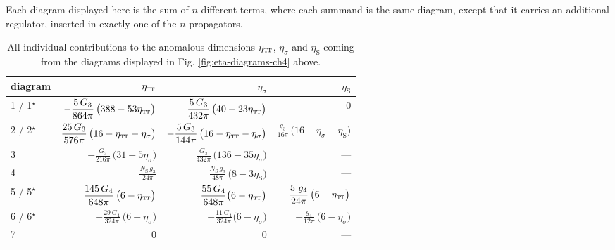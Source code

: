 \documentclass[11pt]{book} %
\newcommand\TTspace{ -1pt }
\newcommand\etaTT{ \eta_{\scriptscriptstyle{\mathrm{T\hspace{\TTspace}T}}} }
\newcommand\etaS{ \eta_{\scriptscriptstyle{\mathrm{S}}} }
\newcommand\NS{ N_{\scriptscriptstyle{\mathrm{S}}} }
\numberwithin{equation}{chapter}
\begin{document}
Each diagram displayed here is the sum of $n$ different terms, where each summand
is the same diagram, except that it carries an additional regulator,
inserted in exactly one of the $n$ propagators.

{
  \setlength{\extrarowheight}{10pt}
  \begin{table}[p]
    \begin{center}
      \begin{tabular}{ l@{\hskip 5mm} r@{\hskip 7mm} r@{\hskip 7mm} r }
        \toprule
        diagram        &  $\etaTT$ & $\eta_\sigma$ & $\etaS$ \\
        \midrule
        1 / 1$^\star$  &  $\displaystyle -\frac{5 \, G_3}{864 \pi} \, \big( 388-53\etaTT \big)$
                       &  $\displaystyle \frac{5 \,  G_3}{432\pi} \, \big(40-23\etaTT \big)$
                       &  $0$                                              \\
        2 / 2$^\star$  &  $\displaystyle \frac{25 \, G_3}{576 \pi} \, \big(16-\etaTT-\eta_{\sigma} \big)$
                       &  $\displaystyle - \frac{5 \,  G_3}{144\pi} \, \big(16-\etaTT- \eta_{\sigma} \big)$
                       &  $\displaystyle \frac{g_3}{16\pi} \, \big(16-\eta_{\sigma}-\etaS \big)$ \\
        3              &  $\displaystyle -\frac{G_3}{216 \pi} \, \big(31-5\eta_{\sigma} \big)$
                       &  $\displaystyle \frac{G_3}{432\pi} \, \big(136 - 35 \eta_{\sigma} \big)$
                       &  ---                                              \\
        4              &  $\displaystyle \frac{\NS \, g_3}{24 \pi}$
                       &  $\displaystyle \frac{\NS \, g_3}{48 \pi} \, \big(8-3\etaS \big)$
                       &  ---                                              \\
        5 / 5$^\star$  &  $\displaystyle \frac{145 \, G_4}{648 \pi} \, \big(6-\etaTT  \big)$
                       &  $\displaystyle \frac{55 \, G_4}{648 \pi}\big(6-\etaTT \big)$
                       &  $\displaystyle \frac{5 \ g_4}{24\pi} \, \big(6-\etaTT \big)$            \\
        6 / 6$^\star$  &  $\displaystyle -\frac{29 \, G_4}{324 \pi} \, \big(6-\eta_{\sigma} \big)$
                       &  $\displaystyle -\frac{11 \, G_4}{324 \pi} \big(6-\eta_{\sigma} \big)$
                       &  $\displaystyle -\frac{g_4}{12 \pi} \, \big(6-\eta_{\sigma} \big)$       \\
        7              &  $0$
                       &  $0$
                       &  ---                                              \\
        \bottomrule
      \end{tabular}
    \end{center}
    \caption[Coordinates and critical exponents of fixed points in perturbative approximation]
    {
      All individual contributions to the anomalous dimensions $\etaTT$, $\eta_\sigma$ and $\etaS$
      coming from the diagrams displayed in Fig. \ref{fig:eta-diagrams-ch4} above.
    }
    \label{tab:eta_results}
  \end{table}
}
\end{document}
